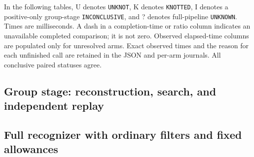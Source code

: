 In the following tables, U denotes \texttt{UNKNOT}, K denotes
\texttt{KNOTTED}, I denotes a positive-only group-stage
\texttt{INCONCLUSIVE}, and ? denotes full-pipeline \texttt{UNKNOWN}.
Times are milliseconds. A dash in a completion-time or ratio column
indicates an unavailable completed comparison; it is not zero. Observed
elapsed-time columns are populated only for unresolved arms.
Exact observed times and the reason for each unfinished call are retained
in the JSON and per-arm journals. All conclusive paired statuses agree.

\subsection{Group stage: reconstruction, search, and independent replay}



\subsection{Full recognizer with ordinary filters and fixed allowances}


